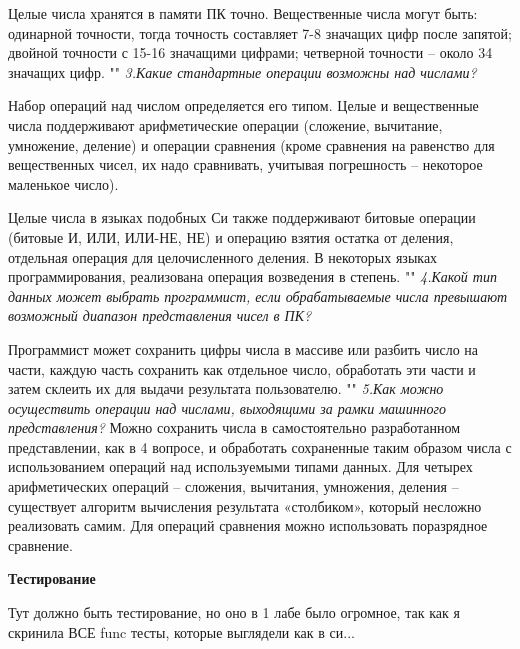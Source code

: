 \documentclass[a4paper, 12pt, -shell-escape]{article}  %
\begin{document}
	Целые числа хранятся в памяти ПК точно. Вещественные числа могут быть: одинарной точности, тогда точность составляет 7-8 значащих цифр после запятой; двойной точности с 15-16 значащими цифрами; четверной точности – около 34 значащих цифр.
	""\newline\newline
	\textit{3.Какие стандартные операции возможны над числами?}
	
	Набор операций над числом определяется его типом. Целые и вещественные числа поддерживают арифметические операции (сложение, вычитание, умножение, деление) и операции сравнения (кроме сравнения на равенство для вещественных чисел, их надо сравнивать, учитывая погрешность – некоторое маленькое число).
	
	Целые числа в языках подобных Си также поддерживают битовые операции (битовые И, ИЛИ, ИЛИ-НЕ, НЕ) и операцию взятия остатка от деления, отдельная операция для целочисленного деления. В некоторых языках программирования, реализована операция возведения в степень.
	""\newline\newline
	\textit{4.Какой тип данных может выбрать программист, если обрабатываемые числа превышают возможный диапазон представления чисел в ПК?}
	
	Программист может сохранить цифры числа в массиве или разбить число на части, каждую часть сохранить как отдельное число, обработать эти части и затем склеить их для выдачи результата пользователю.
	""\newline\newline
	\textit{5.Как можно осуществить операции над числами, выходящими за рамки машинного представления?}
	Можно сохранить числа в самостоятельно разработанном представлении, как в 4 вопросе, и обработать сохраненные таким образом числа с использованием операций над используемыми типами данных. Для четырех арифметических операций – сложения, вычитания, умножения, деления – существует алгоритм вычисления результата «столбиком», который несложно реализовать самим. Для операций сравнения можно использовать поразрядное сравнение.
	
	
	
	\newpage
	\begin{center}
		\begin{large}
			\noindent\textbf{Тестирование}\\
		\end{large}
	\end{center}
	
	Тут должно быть тестирование, но оно в 1 лабе было огромное, так как я скринила ВСЕ func тесты, которые выглядели как в си...
	
\end{document}
